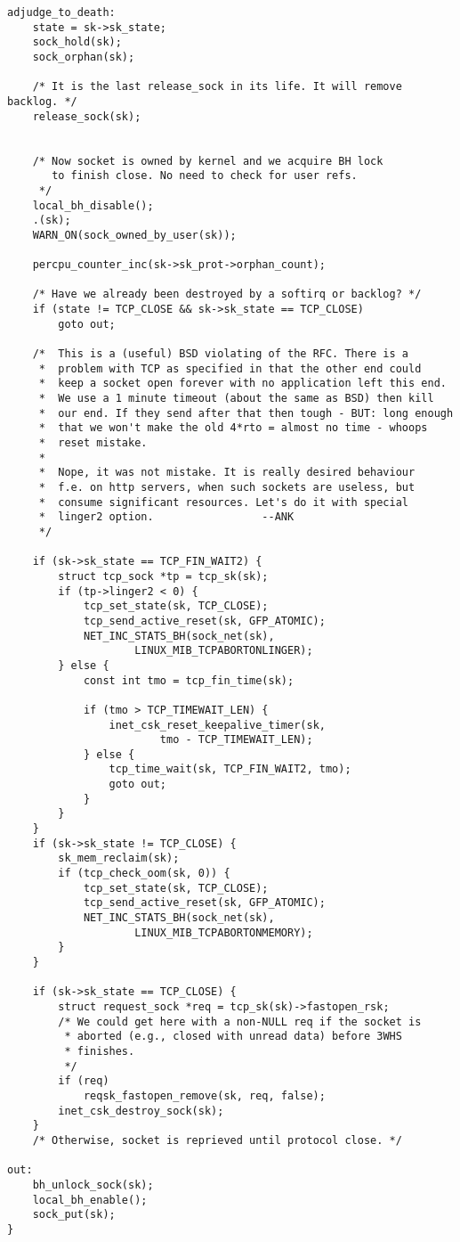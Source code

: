 \begin{verbatim}
adjudge_to_death:
	state = sk->sk_state;
	sock_hold(sk);
	sock_orphan(sk);

	/* It is the last release_sock in its life. It will remove backlog. */
	release_sock(sk);


	/* Now socket is owned by kernel and we acquire BH lock
	   to finish close. No need to check for user refs.
	 */
	local_bh_disable();
	.(sk);
	WARN_ON(sock_owned_by_user(sk));

	percpu_counter_inc(sk->sk_prot->orphan_count);

	/* Have we already been destroyed by a softirq or backlog? */
	if (state != TCP_CLOSE && sk->sk_state == TCP_CLOSE)
		goto out;

	/*	This is a (useful) BSD violating of the RFC. There is a
	 *	problem with TCP as specified in that the other end could
	 *	keep a socket open forever with no application left this end.
	 *	We use a 1 minute timeout (about the same as BSD) then kill
	 *	our end. If they send after that then tough - BUT: long enough
	 *	that we won't make the old 4*rto = almost no time - whoops
	 *	reset mistake.
	 *
	 *	Nope, it was not mistake. It is really desired behaviour
	 *	f.e. on http servers, when such sockets are useless, but
	 *	consume significant resources. Let's do it with special
	 *	linger2	option.					--ANK
	 */

	if (sk->sk_state == TCP_FIN_WAIT2) {
		struct tcp_sock *tp = tcp_sk(sk);
		if (tp->linger2 < 0) {
			tcp_set_state(sk, TCP_CLOSE);
			tcp_send_active_reset(sk, GFP_ATOMIC);
			NET_INC_STATS_BH(sock_net(sk),
					LINUX_MIB_TCPABORTONLINGER);
		} else {
			const int tmo = tcp_fin_time(sk);

			if (tmo > TCP_TIMEWAIT_LEN) {
				inet_csk_reset_keepalive_timer(sk,
						tmo - TCP_TIMEWAIT_LEN);
			} else {
				tcp_time_wait(sk, TCP_FIN_WAIT2, tmo);
				goto out;
			}
		}
	}
	if (sk->sk_state != TCP_CLOSE) {
		sk_mem_reclaim(sk);
		if (tcp_check_oom(sk, 0)) {
			tcp_set_state(sk, TCP_CLOSE);
			tcp_send_active_reset(sk, GFP_ATOMIC);
			NET_INC_STATS_BH(sock_net(sk),
					LINUX_MIB_TCPABORTONMEMORY);
		}
	}

	if (sk->sk_state == TCP_CLOSE) {
		struct request_sock *req = tcp_sk(sk)->fastopen_rsk;
		/* We could get here with a non-NULL req if the socket is
		 * aborted (e.g., closed with unread data) before 3WHS
		 * finishes.
		 */
		if (req)
			reqsk_fastopen_remove(sk, req, false);
		inet_csk_destroy_sock(sk);
	}
	/* Otherwise, socket is reprieved until protocol close. */

out:
	bh_unlock_sock(sk);
	local_bh_enable();
	sock_put(sk);
}
\end{verbatim}
